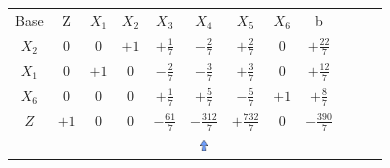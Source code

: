 \begin{frame}
{\begin{table}
\begin{tabular}{c c c c c c c c c c c c}
				\cellcolor{blue!100} \color{white} \scriptsize Base 
				&\cellcolor{blue!100} \color{red} \scriptsize Z 
				&\cellcolor{blue!100} \color{red} $\scriptstyle X_1$ 
				&\cellcolor{blue!100} \color{red} $\scriptstyle X_2$ 
				&\cellcolor{blue!100} \color{white}   $\scriptstyle X_3$ 
				&\cellcolor{blue!100} \color{white} $\scriptstyle X_4$ 
				&\cellcolor{blue!100} \color{white}   $\scriptstyle X_5$ 
				&\cellcolor{blue!100} \color{red}   $\scriptstyle X_6$ 
				&\cellcolor{blue!100} \color{white} \scriptsize b \\
				\cellcolor{blue!100} \color{red} $\scriptstyle X_2$
				& \cellcolor{yellow!50} $\scriptstyle 0$
				& \cellcolor{yellow!50} $\scriptstyle 0$
				& \cellcolor{yellow!50} $\scriptstyle +1$
				& \cellcolor{yellow!50} $\scriptstyle +\frac{1}{7}$
				& \cellcolor{gray!50} $\scriptstyle -\frac{2}{7}$
				& \cellcolor{yellow!50} $\scriptstyle +\frac{2}{7}$
				& \cellcolor{yellow!50} $\scriptstyle 0$
				& \cellcolor{yellow!50} $\scriptstyle +\frac{22}{7}$ \\
			    \cellcolor{blue!100} \color{red} $\scriptstyle X_1$
				& \cellcolor{yellow!50} $\scriptstyle 0$
				& \cellcolor{yellow!50} $\scriptstyle +1$
				& \cellcolor{yellow!50} $\scriptstyle 0$
				& \cellcolor{yellow!50} $\scriptstyle -\frac{2}{7}$			
				& \cellcolor{gray!50} $\scriptstyle -\frac{3}{7}$
				& \cellcolor{yellow!50} $\scriptstyle +\frac{3}{7}$
				& \cellcolor{yellow!50} $\scriptstyle 0$ 
				& \cellcolor{yellow!50} $\scriptstyle +\frac{12}{7}$  \\
				\cellcolor{blue!100} \color{red} $\scriptstyle X_6$
				& \cellcolor{yellow!50} $\scriptstyle 0$
				& \cellcolor{yellow!50} $\scriptstyle 0$
				& \cellcolor{yellow!50} $\scriptstyle 0$
				& \cellcolor{yellow!50} $\scriptstyle +\frac{1}{7}$
				& \cellcolor{gray!50} $\scriptstyle +\frac{5}{7}$
				& \cellcolor{yellow!50} $\scriptstyle -\frac{5}{7}$
				& \cellcolor{yellow!50} $\scriptstyle +1$
				& \cellcolor{yellow!50} $\scriptstyle +\frac{8}{7}$ \\
				\cellcolor{blue!100} \color{white} $\scriptstyle Z$
				& \cellcolor{yellow!50} $\scriptstyle +1$
				& \cellcolor{yellow!50} $\scriptstyle 0$
				& \cellcolor{yellow!50} $\scriptstyle 0$
				& \cellcolor{yellow!50} $\scriptstyle -\frac{61}{7}$
				& \cellcolor{gray!50} $\scriptstyle -\frac{312}{7}$
				& \cellcolor{yellow!50} $\scriptstyle +\frac{732}{7}$
				& \cellcolor{yellow!50} $\scriptstyle 0$ 
				& \cellcolor{yellow!50} $\scriptstyle -\frac{390}{7}$  \\
				& & & & & \includegraphics[width=0.3cm,height=0.3cm]{setacima.jpg} \\

\end{tabular}
\end{table}}
\end{frame}
